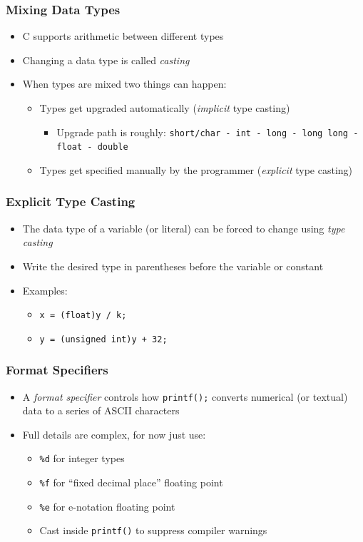 \documentclass[14pt]{beamer}
\begin{document}
\begin{frame}
\frametitle{Mixing Data Types}
\begin{itemize}
\item C supports arithmetic between different types
\item Changing a data type is called \textit{casting}
\item When types are mixed two things can happen:
	\begin{itemize}
		\item Types get upgraded automatically (\textit{implicit} type casting)
			\begin{itemize}
				\item Upgrade path is roughly: \texttt{short/char - int - long - long long - float - double}
			\end{itemize}
		\item Types get specified manually by the programmer (\textit{explicit} type casting)
	\end{itemize}
\end{itemize}
\end{frame}

\begin{frame}
\frametitle{Explicit Type Casting}
\begin{itemize}
\item The data type of a variable (or literal) can be forced to change using \textit{type casting}
\item Write the desired type in parentheses before the variable or constant
\item Examples:
	\begin{itemize}
		\item \texttt{x = (float)y / k;}
		\item \texttt{y = (unsigned int)y + 32;}
	\end{itemize}
\end{itemize}
\end{frame}

\begin{frame}
\frametitle{Format Specifiers}
\begin{itemize}
\item A \textit{format specifier} controls how \texttt{printf();} converts numerical (or textual) data to a series of ASCII characters
\item Full details are complex, for now just use:
	\begin{itemize}
		\item \texttt{\%d} for integer types
		\item \texttt{\%f} for ``fixed decimal place'' floating point
		\item \texttt{\%e} for e-notation floating point
		\item Cast inside \texttt{printf()} to suppress compiler warnings
	\end{itemize}	 
\end{itemize}
\end{frame}
\end{document}
